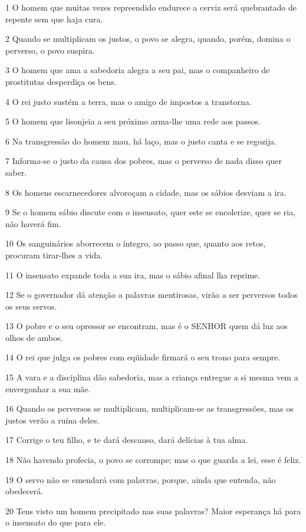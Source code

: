 \par 1 O homem que muitas vezes repreendido endurece a cerviz será quebrantado de repente sem que haja cura.
\par 2 Quando se multiplicam os justos, o povo se alegra, quando, porém, domina o perverso, o povo suspira.
\par 3 O homem que ama a sabedoria alegra a seu pai, mas o companheiro de prostitutas desperdiça os bens.
\par 4 O rei justo sustém a terra, mas o amigo de impostos a transtorna.
\par 5 O homem que lisonjeia a seu próximo arma-lhe uma rede aos passos.
\par 6 Na transgressão do homem mau, há laço, mas o justo canta e se regozija.
\par 7 Informa-se o justo da causa dos pobres, mas o perverso de nada disso quer saber.
\par 8 Os homens escarnecedores alvoroçam a cidade, mas os sábios desviam a ira.
\par 9 Se o homem sábio discute com o insensato, quer este se encolerize, quer se ria, não haverá fim.
\par 10 Os sanguinários aborrecem o íntegro, ao passo que, quanto aos retos, procuram tirar-lhes a vida.
\par 11 O insensato expande toda a sua ira, mas o sábio afinal lha reprime.
\par 12 Se o governador dá atenção a palavras mentirosas, virão a ser perversos todos os seus servos.
\par 13 O pobre e o seu opressor se encontram, mas é o SENHOR quem dá luz aos olhos de ambos.
\par 14 O rei que julga os pobres com eqüidade firmará o seu trono para sempre.
\par 15 A vara e a disciplina dão sabedoria, mas a criança entregue a si mesma vem a envergonhar a sua mãe.
\par 16 Quando os perversos se multiplicam, multiplicam-se as transgressões, mas os justos verão a ruína deles.
\par 17 Corrige o teu filho, e te dará descanso, dará delícias à tua alma.
\par 18 Não havendo profecia, o povo se corrompe; mas o que guarda a lei, esse é feliz.
\par 19 O servo não se emendará com palavras, porque, ainda que entenda, não obedecerá.
\par 20 Tens visto um homem precipitado nas suas palavras? Maior esperança há para o insensato do que para ele.
